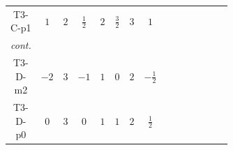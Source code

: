 \documentclass[8pt]{article}
\begin{document}
\begin{landscape}
\begin{longtable}{@{}cccccccc >{\raggedright\arraybackslash}p{0.21\linewidth} >{\raggedright\arraybackslash}p{0.21\linewidth} >{\raggedright\arraybackslash}p{0.21\linewidth}@{}}
\midrule
T3-C-p1 & $1$ & $2$ & $\frac{1}{2}$ & $2$ & $\frac{3}{2}$ & $3$ & $1$ &  & \scriptsize\adjustbox{max width=\linewidth}{$\begin{gathered} -\frac{2 \hbar  \log \left(\frac{\bar{\mu}^{2}}{M_F^2}\right) \overline{y_{2,i_1,r_1}} \overline{Y_{e,i_2,i_3}} H_{a_1} S_{2,j_1} y_{2,i_2,r_1} Y_{e,i_1,i_3} H_{a_1}{}^{\dagger } S_{2,j_1}{}^{\dagger }}{\sqrt{3}} \\ -\frac{2 \hbar  \log \left(\frac{\bar{\mu}^{2}}{M_F^2}\right) \overline{y_{2,i_1,r_1}} \overline{Y_{e,i_2,i_3}} H_{a_2} S_{2,j_2} y_{2,i_2,r_1} Y_{e,i_1,i_3} H_{a_1}{}^{\dagger } S_{2,j_1}{}^{\dagger } \mathcal{I}_{H1,a_1,a_2,j_1,j_2}{}^1}{\sqrt{3}} \\ -\sqrt{3} \hbar  \log \left(\frac{\bar{\mu}^{2}}{M_F^2}\right) \overline{y_{2,i_1,r_1}} H_{a_2} S_{2,j_2} y_{2,i_1,r_1} H_{a_1}{}^{\dagger } S_{2,j_1}{}^{\dagger } \mathcal{I}_{H2,a_1,a_2,j_1,j_2}{}^1 \lambda_{HS_2}^{(1)}^{(1)}\end{gathered}$} &  \\
\textit{cont.} &  &  &  &  &  &  &  &  & \scriptsize\adjustbox{max width=\linewidth}{$\begin{gathered} -\sqrt{3} \hbar  \log \left(\frac{\bar{\mu}^{2}}{M_F^2}\right) \overline{y_{2,i_1,r_1}} H_{a_2} S_{2,j_2} y_{2,i_1,r_1} H_{a_1}{}^{\dagger } S_{2,j_1}{}^{\dagger } \mathcal{I}_{H2,a_1,a_2,j_1,j_2}{}^2 \lambda_{HS_2}^{(1)}^{(2)}\end{gathered}$} &  \\
\midrule
T3-D-m2 & $-2$ & $3$ & $-1$ & $1$ & $0$ & $2$ & $-\frac{1}{2}$ &  & \scriptsize\adjustbox{max width=\linewidth}{$\begin{gathered} -2 \hbar  \log \left(\frac{\bar{\mu}^{2}}{M_F^2}\right) \overline{y_{2,i_1,r_1}} \overline{Y_{e,i_2,i_3}} H_{a_1} S_2 y_{2,i_2,r_1} Y_{e,i_1,i_3} H_{a_1}{}^{\dagger } S_2{}^{\dagger } \\ -2 \hbar  \log \left(\frac{\bar{\mu}^{2}}{M_F^2}\right) \overline{y_{2,i_1,r_1}} H_{a_2} S_2 y_{2,i_1,r_1} H_{a_1}{}^{\dagger } S_2{}^{\dagger } \mathcal{I}_{H2,a_1,a_2}{}^1 \lambda_{HS_2}^{(1)}^{(1)}\end{gathered}$} &  \\
\midrule
T3-D-p0 & $0$ & $3$ & $0$ & $1$ & $1$ & $2$ & $\frac{1}{2}$ &  & \scriptsize\adjustbox{max width=\linewidth}{$\begin{gathered} -2 \hbar  \log \left(\frac{\bar{\mu}^{2}}{M_F^2}\right) \overline{y_{2,i_1,r_1}} \overline{Y_{e,i_2,i_3}} H_{a_1} S_2 y_{2,i_2,r_1} Y_{e,i_1,i_3} H_{a_1}{}^{\dagger } S_2{}^{\dagger } \\ -2 \hbar  \log \left(\frac{\bar{\mu}^{2}}{M_F^2}\right) \overline{y_{2,i_1,r_1}} H_{a_2} S_2 y_{2,i_1,r_1} H_{a_1}{}^{\dagger } S_2{}^{\dagger } \mathcal{I}_{H2,a_1,a_2}{}^1 \lambda_{HS_2}^{(1)}^{(1)}\end{gathered}$} &  \\

\end{longtable}
\end{landscape}
\end{document}
